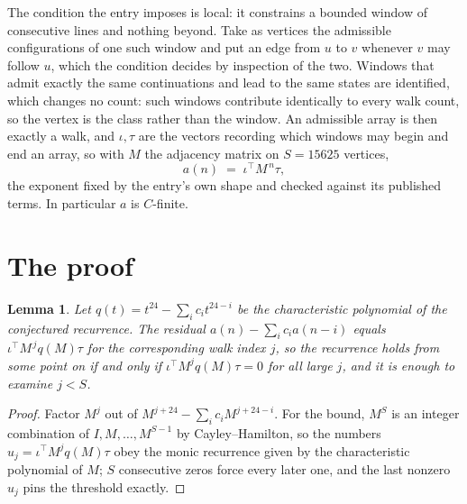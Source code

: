 \documentclass[11pt,a4paper]{article}
\theoremstyle{plain}
\newtheorem{lemma}[theorem]{Lemma}
\theoremstyle{definition}
\begin{document}
The condition the entry imposes is local: it constrains a bounded window of consecutive lines and nothing beyond. Take as vertices the admissible configurations of one such window and put an edge from $u$ to $v$ whenever $v$ may follow $u$, which the condition decides by inspection of the two. Windows that admit exactly the same continuations and lead to the same states are identified, which changes no count: such windows contribute identically to every walk count, so the vertex is the class rather than the window.
An admissible array is then exactly a walk, and $\iota,\tau$ are the vectors recording which windows may begin and end an array, so with $M$ the adjacency matrix on $S=15625$ vertices,
\[
a(n)\;=\;\iota^{\!\top}M^{\,n}\tau ,
\]
the exponent fixed by the entry's own shape and checked against its published terms. In
particular $a$ is $C$-finite.

\section{The proof}

\begin{lemma}\label{lem:crit}
Let $q(t)=t^{24}-\sum_i c_it^{24-i}$ be the characteristic polynomial of the
conjectured recurrence. The residual $a(n)-\sum_ic_ia(n-i)$ equals
$\iota^{\!\top}M^{\,j}q(M)\tau$ for the corresponding walk index $j$, so the recurrence
holds from some point on if and only if $\iota^{\!\top}M^{j}q(M)\tau=0$ for all large $j$,
and it is enough to examine $j<S$.
\end{lemma}

\begin{proof}
Factor $M^{j}$ out of $M^{j+24}-\sum_ic_iM^{j+24-i}$. For the bound, $M^{S}$
is an integer combination of $I,M,\dots,M^{S-1}$ by Cayley--Hamilton, so the numbers
$u_j=\iota^{\!\top}M^{j}q(M)\tau$ obey the monic recurrence given by the characteristic
polynomial of $M$; $S$ consecutive zeros force every later one, and the last nonzero $u_j$
pins the threshold exactly.
\end{proof}
\end{document}
